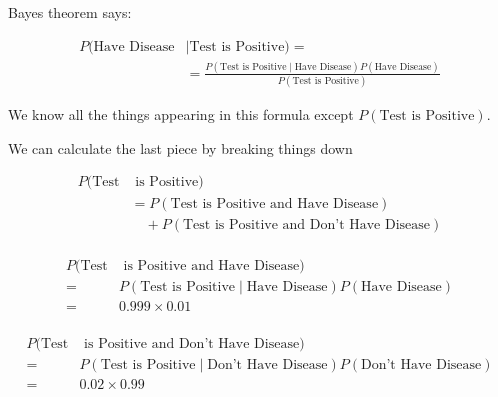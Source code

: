 %
\begin{frame}
Bayes theorem says:

\begin{align*}
P(\text{Have Disease}  & \mid \text{Test is Positive)} = \\
%
& = \frac{  P(\text{Test is
Positive} \mid \text{Have Disease}) P(\text{Have Disease}) } { P(\text{Test is
Positive}) }
\end{align*}

We know all the things appearing in this formula except $ P(\text{Test is
Positive}) $.

\end{frame}
%

%
\begin{frame}

We can calculate the last piece by breaking things down

\begin{align*}
P(\text{Test} & \text{ is Positive}) \\
%
&= P(\text{Test is Positive and Have Disease}) \\
%
& \quad + P(\text{Test is Positive and Don't Have Disease}) \\
\end{align*}

\end{frame}
%

%
\begin{frame}

\begin{align*}
P(\text{Test} & \text{ is Positive and Have Disease}) \\
%
=& P(\text{Test is Positive} \mid \text{Have Disease}) P(\text{Have Disease}) \\
=& 0.999 \times 0.01 \\
\end{align*}

\end{frame}
%

%
\begin{frame}

\begin{align*}
P(\text{Test} & \text{ is Positive and Don't Have Disease}) \\
%
=& P(\text{Test is Positive} \mid \text{Don't Have Disease}) P(\text{Don't Have Disease}) \\
=& 0.02 \times 0.99 \\
\end{align*}

\end{frame}


